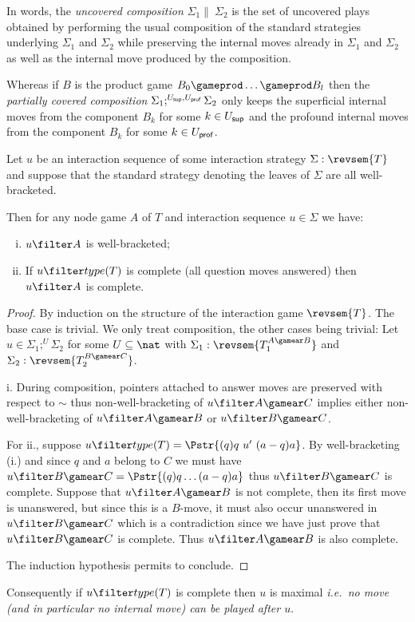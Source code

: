 In words, the \emph{uncovered composition}
$\Sigma_1 \|\ \Sigma_2$ is the set of uncovered plays obtained by performing the usual composition of the standard strategies underlying $\Sigma_1$ and $\Sigma_2$ while preserving the internal moves already in $\Sigma_1$ and $\Sigma_2$ as well as the internal move produced by the composition.

Whereas if $B$ is the product game $B_0
\gameprod \ldots \gameprod B_l$ then the \emph{partially covered composition}
$\Sigma_1 ;^{U_{\sf sup}, U_{\sf prof}} \Sigma_2$
only keeps the superficial internal moves from the component $B_k$ for some $k \in U_{\sf sup}$ and the profound internal moves from the component $B_k$ for some $k \in U_{\sf prof}$.
\smallskip



\begin{lemma}
\label{lem:inter_complete}
Let $u$ be an interaction sequence of some interaction strategy $\Sigma : \revsem{T}$
and suppose that the standard strategy denoting the leaves of $\Sigma$ are all well-bracketed.

Then for any node game $A$ of $T$ and interaction sequence $u\in
\Sigma$ we have:
\begin{enumerate}[i.]
\item $u \filter A$ is well-bracketed;

\item If $u \filter type(T)$ is complete (all question moves answered) then
    $u \filter A$ is complete.
\end{enumerate}
\end{lemma}
\begin{proof}
By induction on the structure of the interaction game
$\revsem{T}$. The base case is trivial. We only treat composition,
the other cases being trivial: Let $ u \in \Sigma_1 ; ^U \Sigma_2$
for some $U \subseteq \nat$ with $\Sigma_1 : \revsem{T_1^{A\gamear
B}}$ and $\Sigma_2 : \revsem{T_2^{B\gamear C}}$.

i. During composition, pointers attached to answer moves are
preserved with respect to $\sim$ thus non-well-bracketing of
$u\filter A\gamear C$ implies either non-well-bracketing of
$u\filter A\gamear B$ or $u\filter B\gamear C$.

For ii., suppose $u \filter type(T) = \Pstr{(q)q\ u'\ (a-q)a }$. By
well-bracketing (i.) and since $q$ and $a$ belong to $C$ we must
have $u \filter B\gamear C = \Pstr{(q)q \ldots (a-q)a}$ thus $u
\filter B\gamear C$ is complete. Suppose that $u \filter A\gamear B$
is not complete, then its first move is unanswered, but since this
is a $B$-move, it must also occur unanswered in $u \filter B\gamear
C$ which is a contradiction since we have just prove that $u \filter
B\gamear C$ is complete. Thus $u \filter A\gamear B$ is also
complete.

The induction hypothesis permits to conclude.
\end{proof}
Consequently if $u\filter type(T)$ is complete then $u$ is maximal {\em i.e.~no move (and in particular no internal move) can be played after $u$}.

